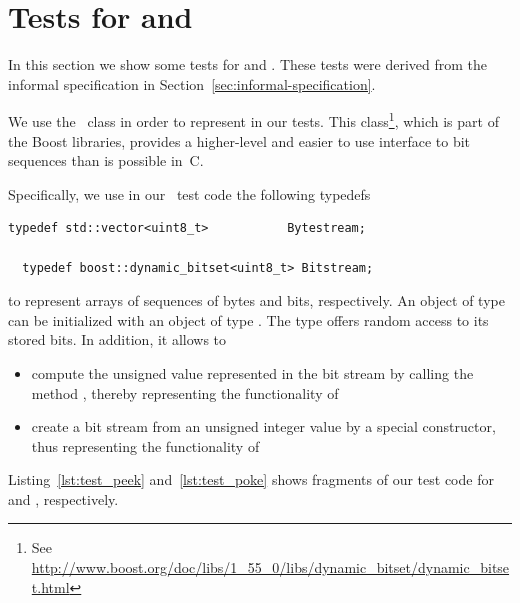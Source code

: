 \clearpage

\clearpage

\section{Tests for \peek and \poke}
\label{sec:bitwalker-tests}

In this section we show some tests for \peek and \poke.
These tests were derived from the informal specification in 
Section~\ref{sec:informal-specification}.

We use the \CC\ class  in order to represent
 in our tests.
This class\footnote{
  See \url{http://www.boost.org/doc/libs/1_55_0/libs/dynamic_bitset/dynamic_bitset.html}
},
which is part of the \textsf{Boost} libraries,
provides a higher-level and easier to use interface to bit sequences than is possible in~C.

Specifically, we use in our \CC\ test code the following typedefs

\begin{lstlisting}[style = acsl-block]
  typedef std::vector<uint8_t>           Bytestream;

  typedef boost::dynamic_bitset<uint8_t> Bitstream;
\end{lstlisting}

to represent arrays of sequences of bytes and bits, respectively.
An object of type  can be initialized with an object
of type . The type  offers random access
to its stored bits.
In addition, it allows to
\begin{itemize}
\item  compute the unsigned value represented in the bit stream by calling the
       method , thereby representing the functionality of \peek
\item  create a bit stream from an unsigned integer value by a special constructor,
       thus representing the functionality of \poke
\end{itemize}

Listing~\ref{lst:test_peek} and~\ref{lst:test_poke} shows fragments of our test code
for \peek and \poke, respectively.

